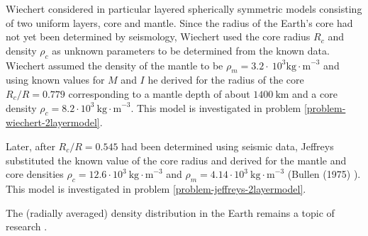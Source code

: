Wiechert considered in particular layered spherically symmetric 
models consisting of two uniform layers, core and mantle.
Since the radius of the Earth's core had not yet been determined by
seismology, Wiechert used the core radius $R_c$ and density 
$\rho_c$ as unknown parameters to be determined from the
known data.
Wiechert assumed the density of the mantle to be 
$\rho_m=3.2 \cdot~10^3 \mathrm{kg\cdot m}^{-3}$ and using known values for $M$ and $I$
he derived for the radius of the core
$R_c/R = 0.779$ corresponding to a mantle depth of about
$1400~\mathrm{km}$ and a core density 
$\rho_c=8.2\cdot 10^3~\mathrm{kg\cdot m}^{-3}$.
This model is investigated in problem 
\ref{problem-wiechert-2layermodel}.

Later, after $R_c/R = 0.545$ had been determined using
seismic data, Jeffreys substituted the known value of the
core radius and derived for the mantle and core densities
$\rho_c=12.6\cdot 10^3~ \mathrm{kg\cdot m}^{-3}$ and 
$\rho_m=4.14\cdot 10^3~ \mathrm{kg\cdot m}^{-3}$ (Bullen (1975) \cite{bull75}).
This model is investigated in problem 
\ref{problem-jeffreys-2layermodel}.

The (radially averaged) density distribution in the Earth remains a topic of research
\cite{kenn98}.
